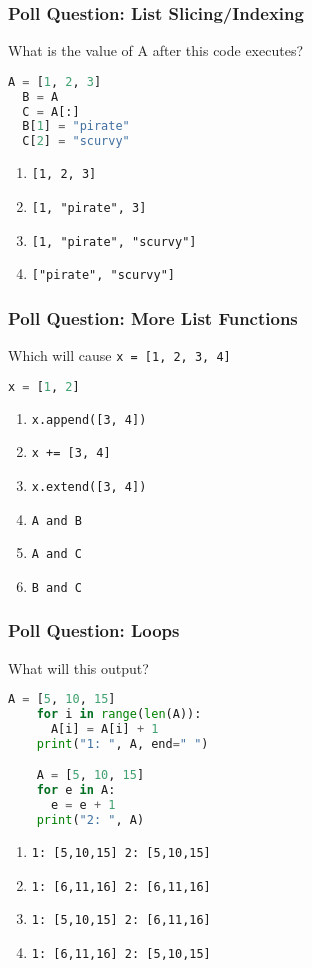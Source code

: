 \documentclass{beamer}
\begin{document}
%
%
\begin{frame}[fragile]
  \frametitle{Poll Question: List Slicing/Indexing}
  What is the value of A after this code executes?
  \begin{lstlisting}[language=Python, autogobble]
  A = [1, 2, 3]
  B = A
  C = A[:]
  B[1] = "pirate"
  C[2] = "scurvy"
  \end{lstlisting}
  \vfill
  \begin{enumerate}[A]
    \item \lstinline|[1, 2, 3]|
    \item \lstinline|[1, "pirate", 3]|
    \item \lstinline|[1, "pirate", "scurvy"]|
    \item \lstinline|["pirate", "scurvy"]|
  \end{enumerate}
\end{frame}

%
%
\begin{frame}[fragile]
  \frametitle{Poll Question: More List Functions}
  Which will cause \lstinline|x = [1, 2, 3, 4]|
  \begin{lstlisting}[language=Python, autogobble]
  x = [1, 2]
  \end{lstlisting}
  \vfill
  \begin{enumerate}[A]
    \item \lstinline|x.append([3, 4])|
    \item \lstinline|x += [3, 4]|
    \item \lstinline|x.extend([3, 4])|
    \item \lstinline|A and B|
    \item \lstinline|A and C|
    \item \lstinline|B and C|
  \end{enumerate}
\end{frame}

%
%
\begin{frame}[fragile]
  \frametitle{Poll Question: Loops}
  What will this output?\\
  \begin{minipage}{0.48\textwidth}
    \begin{lstlisting}[language=Python, autogobble]
    A = [5, 10, 15]
    for i in range(len(A)):
      A[i] = A[i] + 1
    print("1: ", A, end=" ")

    A = [5, 10, 15]
    for e in A:
      e = e + 1
    print("2: ", A)
    \end{lstlisting}
  \end{minipage}
  \hfill
  \begin{minipage}{0.48\textwidth}
    \begin{enumerate}[A]
      \item \lstinline|1: [5,10,15] 2: [5,10,15]|
      \item \lstinline|1: [6,11,16] 2: [6,11,16]|
      \item \lstinline|1: [5,10,15] 2: [6,11,16]|
      \item \lstinline|1: [6,11,16] 2: [5,10,15]|
    \end{enumerate}
  \end{minipage}
\end{frame}
\end{document}
